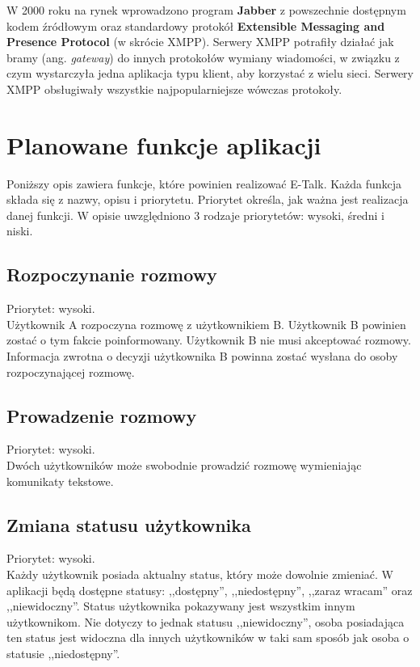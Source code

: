 \documentclass[a4paper,12pt]{article}
\begin{document}
W 2000 roku na rynek wprowadzono program \textbf{Jabber} z powszechnie dostępnym kodem źródłowym oraz standardowy protokół \textbf{Extensible Messaging and Presence Protocol} (w skrócie XMPP). Serwery XMPP potrafiły działać jak bramy (ang. \textit{gateway}) do innych protokołów wymiany wiadomości, w związku z czym wystarczyła jedna aplikacja typu klient, aby korzystać z wielu sieci. Serwery XMPP obsługiwały wszystkie najpopularniejsze wówczas protokoły.



\section[Planowane funkcje aplikacji E-Talk]{Planowane funkcje aplikacji}

Poniższy opis zawiera funkcje, które powinien realizować E-Talk. Każda funkcja składa się z nazwy, opisu i priorytetu. Priorytet określa, jak ważna jest realizacja danej funkcji. W opisie uwzględniono 3 rodzaje priorytetów: wysoki, średni i niski.
\subsection[Rozpoczynanie rozmowy]{Rozpoczynanie rozmowy}
Priorytet: wysoki.\\

Użytkownik A rozpoczyna rozmowę z użytkownikiem B. Użytkownik B powinien zostać o tym fakcie poinformowany. Użytkownik B nie musi akceptować rozmowy. Informacja zwrotna o decyzji użytkownika B powinna zostać wysłana do osoby rozpoczynającej rozmowę.

\subsection[Prowadzenie rozmowy]{Prowadzenie rozmowy}

Priorytet: wysoki.\\

Dwóch użytkowników może swobodnie prowadzić rozmowę wymieniając komunikaty tekstowe.

\subsection[Zmiana statusu użytkownika]{Zmiana statusu użytkownika}

Priorytet: wysoki.\\

Każdy użytkownik posiada aktualny status, który może dowolnie zmieniać. W aplikacji będą dostępne statusy: ,,dostępny'', ,,niedostępny'', ,,zaraz wracam'' oraz ,,niewidoczny''. Status użytkownika pokazywany jest wszystkim innym użytkownikom. Nie dotyczy to jednak statusu ,,niewidoczny'', osoba posiadająca ten status jest widoczna dla innych użytkowników w taki sam sposób jak osoba o statusie ,,niedostępny''.
\end{document}
